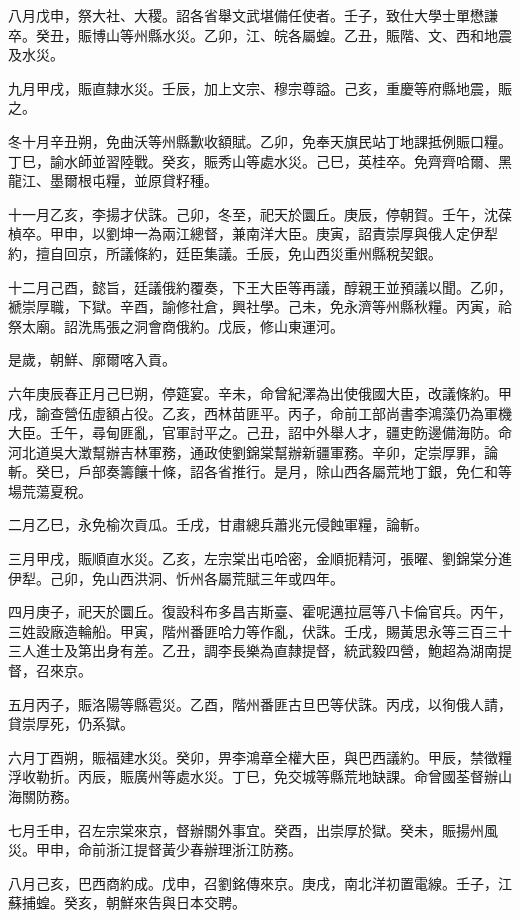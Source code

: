 \begin{pinyinscope}
八月戊申，祭大社、大稷。詔各省舉文武堪備任使者。壬子，致仕大學士單懋謙卒。癸丑，賑博山等州縣水災。乙卯，江、皖各屬蝗。乙丑，賑階、文、西和地震及水災。

九月甲戌，賑直隸水災。壬辰，加上文宗、穆宗尊謚。己亥，重慶等府縣地震，賑之。

冬十月辛丑朔，免曲沃等州縣歉收額賦。乙卯，免奉天旗民站丁地課抵例賑口糧。丁巳，諭水師並習陸戰。癸亥，賑秀山等處水災。己巳，英桂卒。免齊齊哈爾、黑龍江、墨爾根屯糧，並原貸籽種。

十一月乙亥，李揚才伏誅。己卯，冬至，祀天於圜丘。庚辰，停朝賀。壬午，沈葆楨卒。甲申，以劉坤一為兩江總督，兼南洋大臣。庚寅，詔責崇厚與俄人定伊犁約，擅自回京，所議條約，廷臣集議。壬辰，免山西災重州縣稅契銀。

十二月己酉，懿旨，廷議俄約覆奏，下王大臣等再議，醇親王並預議以聞。乙卯，褫崇厚職，下獄。辛酉，諭修社倉，興社學。己未，免永濟等州縣秋糧。丙寅，祫祭太廟。詔洗馬張之洞會商俄約。戊辰，修山東運河。

是歲，朝鮮、廓爾喀入貢。

六年庚辰春正月己巳朔，停筵宴。辛未，命曾紀澤為出使俄國大臣，改議條約。甲戌，諭查營伍虛額占役。乙亥，西林苗匪平。丙子，命前工部尚書李鴻藻仍為軍機大臣。壬午，尋甸匪亂，官軍討平之。己丑，詔中外舉人才，疆吏飭邊備海防。命河北道吳大澂幫辦吉林軍務，通政使劉錦棠幫辦新疆軍務。辛卯，定崇厚罪，論斬。癸巳，戶部奏籌饟十條，詔各省推行。是月，除山西各屬荒地丁銀，免仁和等場荒蕩夏稅。

二月乙巳，永免榆次貢瓜。壬戌，甘肅總兵蕭兆元侵蝕軍糧，論斬。

三月甲戌，賑順直水災。乙亥，左宗棠出屯哈密，金順扼精河，張曜、劉錦棠分進伊犁。己卯，免山西洪洞、忻州各屬荒賦三年或四年。

四月庚子，祀天於圜丘。復設科布多昌吉斯臺、霍呢邁拉扈等八卡倫官兵。丙午，三姓設廠造輪船。甲寅，階州番匪哈力等作亂，伏誅。壬戌，賜黃思永等三百三十三人進士及第出身有差。乙丑，調李長樂為直隸提督，統武毅四營，鮑超為湖南提督，召來京。

五月丙子，賑洛陽等縣雹災。乙酉，階州番匪古旦巴等伏誅。丙戌，以徇俄人請，貸崇厚死，仍系獄。

六月丁酉朔，賑福建水災。癸卯，畀李鴻章全權大臣，與巴西議約。甲辰，禁徵糧浮收勒折。丙辰，賑廣州等處水災。丁巳，免交城等縣荒地缺課。命曾國荃督辦山海關防務。

七月壬申，召左宗棠來京，督辦關外事宜。癸酉，出崇厚於獄。癸未，賑揚州風災。甲申，命前浙江提督黃少春辦理浙江防務。

八月己亥，巴西商約成。戊申，召劉銘傳來京。庚戌，南北洋初置電線。壬子，江蘇捕蝗。癸亥，朝鮮來告與日本交聘。


\end{pinyinscope}

